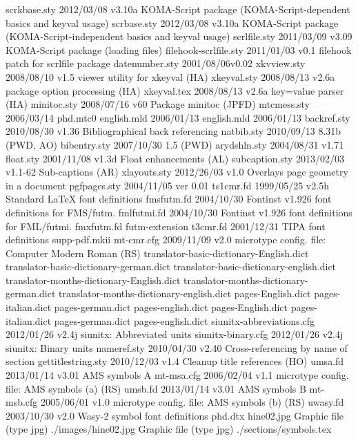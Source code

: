 scrkbase.sty    2012/03/08 v3.10a KOMA-Script package (KOMA-Script-dependent basics and keyval usage)
 scrbase.sty    2012/03/08 v3.10a KOMA-Script package (KOMA-Script-independent basics and keyval usage)
scrlfile.sty    2011/03/09 v3.09 KOMA-Script package (loading files)
filehook-scrlfile.sty    2011/01/03 v0.1 filehook patch for scrlfile package
datenumber.sty    2001/08/06v0.02
 xkvview.sty    2008/08/10 v1.5 viewer utility for xkeyval (HA)
 xkeyval.sty    2008/08/13 v2.6a package option processing (HA)
 xkeyval.tex    2008/08/13 v2.6a key=value parser (HA)
 minitoc.sty    2008/07/16 v60 Package minitoc (JPFD)
 mtcmess.sty    2006/03/14
     phd.mtc0
 english.mld    2006/01/13
 english.mld    2006/01/13
 backref.sty    2010/08/30 v1.36 Bibliographical back referencing
  natbib.sty    2010/09/13 8.31b (PWD, AO)
bibentry.sty    2007/10/30 1.5 (PWD)
arydshln.sty    2004/08/31 v1.71 
   float.sty    2001/11/08 v1.3d Float enhancements (AL)
subcaption.sty    2013/02/03 v1.1-62 Sub-captions (AR)
xlayouts.sty    2012/26/03 v1.0 Overlays page geometry in a document
pgfpages.sty    2004/11/05 ver 0.01
  ts1cmr.fd    1999/05/25 v2.5h Standard LaTeX font definitions
 fmsfutm.fd    2004/10/30 Fontinst v1.926 font definitions for FMS/futm.
fmlfutmi.fd    2004/10/30 Fontinst v1.926 font definitions for FML/futmi.
 fmxfutm.fd    futm-extension
   t3cmr.fd    2001/12/31 TIPA font definitions
supp-pdf.mkii
  mt-cmr.cfg    2009/11/09 v2.0 microtype config. file: Computer Modern Roman (RS)
translator-basic-dictionary-English.dict    
translator-basic-dictionary-german.dict
translator-basic-dictionary-english.dict
translator-months-dictionary-English.dict    
translator-months-dictionary-german.dict
translator-months-dictionary-english.dict
pages-English.dict
pages-italian.dict
pages-german.dict
pages-english.dict
pages-English.dict
pages-italian.dict
pages-german.dict
pages-english.dict
siunitx-abbreviations.cfg    2012/01/26 v2.4j siunitx: Abbreviated units
siunitx-binary.cfg    2012/01/26 v2.4j siunitx: Binary units
 nameref.sty    2010/04/30 v2.40 Cross-referencing by name of section
gettitlestring.sty    2010/12/03 v1.4 Cleanup title references (HO)
    umsa.fd    2013/01/14 v3.01 AMS symbols A
  mt-msa.cfg    2006/02/04 v1.1 microtype config. file: AMS symbols (a) (RS)
    umsb.fd    2013/01/14 v3.01 AMS symbols B
  mt-msb.cfg    2005/06/01 v1.0 microtype config. file: AMS symbols (b) (RS)
   uwasy.fd    2003/10/30 v2.0 Wasy-2 symbol font definitions
     phd.dtx
  hine02.jpg    Graphic file (type jpg)
./images/hine02.jpg    Graphic file (type jpg)
./sections/symbols.tex
